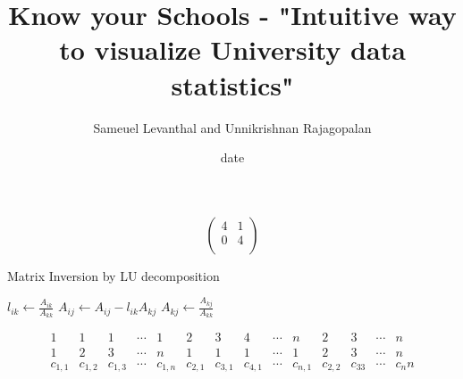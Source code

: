 \documentclass[11pt, a4paper]{article}
\title{Know your Schools - "Intuitive way to visualize University data statistics"
}
\author{Sameuel Levanthal and Unnikrishnan Rajagopalan}
\date{date}
\begin{document}
\maketitle





\iffalse

%
%
\begin{figure}[H]
\label{fig:prob1fig}
\end{figure}

%
%
\[ \begin{pmatrix}
  4 & 1 \\
  0 & 4 \\
\end{pmatrix}\]

%
%
  \begin{algorithm}[H]
\caption{Matrix Inversion by LU decomposition}
\begin{algorithmic}
              \State $l_{ik} \leftarrow \frac{A_{ik}}{A_{kk}}$ 
                        \State $A_{ij} \leftarrow A_{ij} - l_{ik}A_{kj}$ 
                    \EndFor
                    \EndIf
                    \State $A_{kj} \leftarrow \frac{A_{kj}}{A_{kk}}$ 
                    \EndFor
      \EndFor
  \EndFor
\end{algorithmic}
\end{algorithm}

%
%
  \[
  \begin{smallmatrix}
    1 & 1 & 1 & \cdots & 1 & 2 & 3 & 4 & \cdots & n & 2 & 3 & \cdots &n\\
    1 & 2 & 3 & \cdots & n & 1 & 1 & 1 & \cdots & 1 & 2 & 3 & \cdots & n\\
    c_{1,1} & c_{1,2} & c_{1,3} & \cdots & c_{1,n} & c_{2,1} & c_{3,1} & c_{4,1} & \cdots & c_{n,1} & c_{2,2} & c_33 &\cdots &c_nn\\
  \end{smallmatrix}
\]

%
%
\noindent{}
\end{document}
